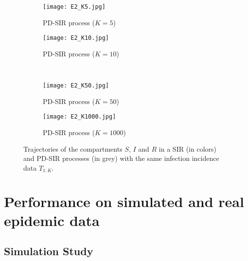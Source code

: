 \documentclass[11pt]{article}
\begin{document}
	\begin{figure}
		\centering
		\begin{subfigure}[b]{0.49\textwidth}
			\centering
			\texttt{[image: E2\_K5.jpg]}
			\caption{PD-SIR process ($K = 5$)}
			\label{fig:comparison_RD_SIR_K5}
		\end{subfigure}
		\hfill
		\begin{subfigure}[b]{0.49\textwidth}
			\centering
			\texttt{[image: E2\_K10.jpg]}
			\caption{PD-SIR process ($K = 10$)}
			\label{fig:comparison_RD_SIR_K10}
		\end{subfigure}
		\\
		\begin{subfigure}[b]{0.49\textwidth}
			\centering
			\texttt{[image: E2\_K50.jpg]}
			\caption{PD-SIR process ($K = 50$)}
			\label{fig:comparison_RD_SIR_K50}
		\end{subfigure}
		\hfill
		\begin{subfigure}[b]{0.49\textwidth}
			\centering
			\texttt{[image: E2\_K1000.jpg]}
			\caption{PD-SIR process ($K = 1000$)}
			\label{fig:comparison_RD_SIR_K1000}
		\end{subfigure}
		\caption{Trajectories of the compartments $S$, $I$ and $R$ in a SIR (in colors) and PD-SIR processes (in grey) with the same infection incidence data $T_{1:K}$.}
		\label{fig:comparison}
	\end{figure}
	
	
	\section{Performance on simulated and real epidemic data}
	\label{sec:per}
	
	\subsection{Simulation Study}
	\label{sec:sim}
	
			
\end{document}
